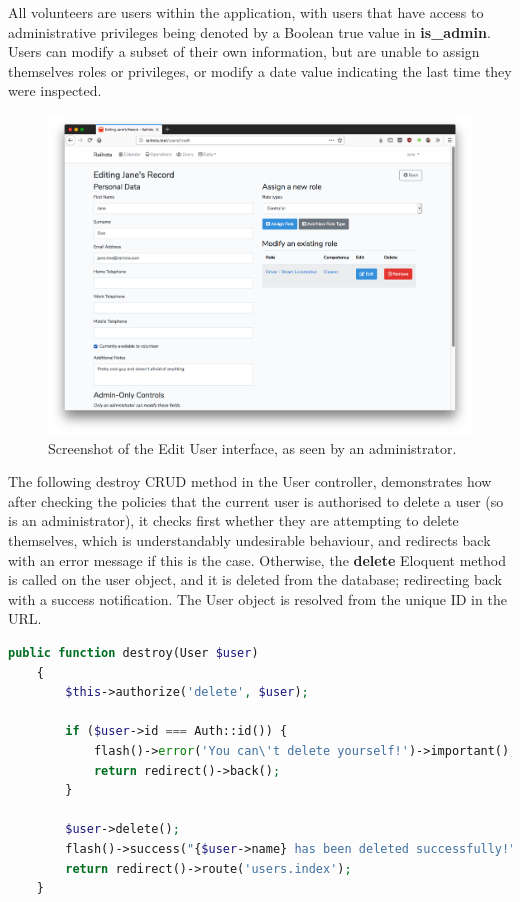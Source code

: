 All volunteers are users within the application, with users that have access to administrative privileges being denoted by a Boolean true value in \textbf{is\_admin}. Users can modify a subset of their own information, but are unable to assign themselves roles or privileges, or modify a date value indicating the last time they were inspected.

\begin{figure}[!ht]
    \centering
    \includegraphics[width=1.0\textwidth]{Figures/screenshot-edit-user}
    \caption{Screenshot of the Edit User interface, as seen by an administrator.}
    \label{fig:users-edit}
\end{figure}

The following destroy CRUD method in the User controller, demonstrates how after checking the policies that the current user is authorised to delete a user (so is an administrator), it checks first whether they are attempting to delete themselves, which is understandably undesirable behaviour, and redirects back with an error message if this is the case. Otherwise, the \textbf{delete} Eloquent method is called on the user object, and it is deleted from the database; redirecting back with a success notification. The User object is resolved from the unique ID in the URL. \cite{Laravel7}

\begin{lstlisting}[language=PHP, breaklines]
    public function destroy(User $user)
    {
        $this->authorize('delete', $user);

        if ($user->id === Auth::id()) {
            flash()->error('You can\'t delete yourself!')->important();
            return redirect()->back();
        }

        $user->delete();
        flash()->success("{$user->name} has been deleted successfully!")->important();
        return redirect()->route('users.index');
    }
\end{lstlisting}

